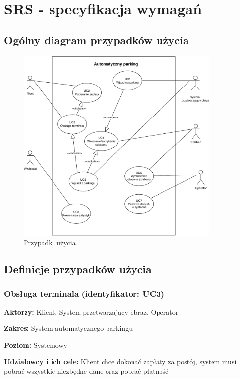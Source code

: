 \chapter{SRS - specyfikacja wymagań}

\section{Ogólny diagram przypadków użycia}

\begin{figure}[H]
	\centering
	\includegraphics[width=100mm]{diagramy/PrzypUzycia.pdf}
	\caption{Przypadki użycia }
\end{figure}

\section{Definicje przypadków użycia}
\subsection{Obsługa terminala (identyfikator: UC3)}
\textbf{Aktorzy: }Klient, System przetwarzający obraz, Operator

\hspace{0cm}\textbf{Zakres: }System automatycznego parkingu

\hspace{0cm}\textbf{Poziom: }Systemowy

\hspace{0cm}\textbf{Udziałowcy i ich cele: }Klient chce dokonać zapłaty za postój, system musi pobrać wszystkie niezbędne dane oraz pobrać płatność


